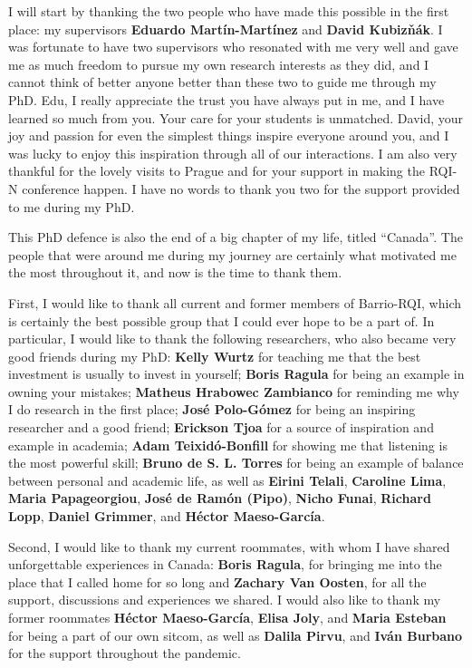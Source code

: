 I will start by thanking the two people who have made this possible in the first place: my supervisors \textbf{Eduardo Martín-Martínez} and \textbf{David Kubiz\v{n}ák}. I was fortunate to have two supervisors who resonated with me very well and gave me as much freedom to pursue my own research interests as they did, and I cannot think of better anyone better than these two to guide me through my PhD. Edu, I really appreciate the trust you have always put in me, and I have learned so much from you. Your care for your students is unmatched. David, your joy and passion for even the simplest things inspire everyone around you, and I was lucky to enjoy this inspiration through all of our interactions. I am also very thankful for the lovely visits to Prague and for your support in making the RQI-N conference happen. I have no words to thank you two for the support provided to me during my PhD. 

This PhD defence is also the end of a big chapter of my life, titled ``Canada''. The people that were around me during my journey are certainly what motivated me the most throughout it, and now is the time to thank them.

First, I would like to thank all current and former members of Barrio-RQI, which is certainly the best possible group that I could ever hope to be a part of. In particular, I would like to thank the following researchers, who also became very good friends during my PhD: \textbf{Kelly Wurtz} for teaching me that the best investment is usually to invest in yourself; \textbf{Boris Ragula} for being an example in owning your mistakes; \textbf{Matheus Hrabowec Zambianco} for reminding me why I do research in the first place; \textbf{José Polo-Gómez} for being an inspiring researcher and a good friend; \textbf{Erickson Tjoa} for a source of inspiration and example in academia; \textbf{Adam Teixidó-Bonfill} for showing me that listening is the most powerful skill; \textbf{Bruno de S. L. Torres} for being an example of balance between personal and academic life, as well as \textbf{Eirini Telali}, \textbf{Caroline Lima}, \textbf{Maria Papageorgiou}, \textbf{José de Ramón (Pipo)}, \textbf{Nicho Funai}, \textbf{Richard Lopp}, \textbf{Daniel Grimmer}, and \textbf{Héctor Maeso-García}.

Second, I would like to thank my current roommates, with whom I have shared unforgettable experiences in Canada: \textbf{Boris Ragula}, for bringing me into the place that I called home for so long and \textbf{Zachary Van Oosten}, for all the support, discussions and experiences we shared. I would also like to thank my former roommates \textbf{Héctor Maeso-García}, \textbf{Elisa Joly}, and \textbf{Maria Esteban} for being a part of our own sitcom, as well as \textbf{Dalila Pirvu}, and \textbf{Iván Burbano} for the support throughout the pandemic.

